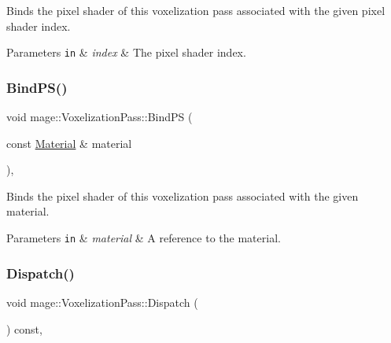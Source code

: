 Binds the pixel shader of this voxelization pass associated with the given pixel shader index.


\begin{DoxyParams}[1]{Parameters}
\mbox{\tt in}  & {\em index} & The pixel shader index. \\
\hline
\end{DoxyParams}
\hypertarget{classmage_1_1_voxelization_pass_a4dce943e59020690124a2db73004d135}{}\label{classmage_1_1_voxelization_pass_a4dce943e59020690124a2db73004d135} 
\subsubsection{\texorpdfstring{Bind\+P\+S()}{BindPS()}\hspace{0.1cm}{\footnotesize\ttfamily [2/2]}}
{\footnotesize\ttfamily void mage\+::\+Voxelization\+Pass\+::\+Bind\+PS (\begin{DoxyParamCaption}\item[{const \hyperlink{classmage_1_1_material}{Material} \&}]{material }\end{DoxyParamCaption})\hspace{0.3cm}{\ttfamily [private]}, {\ttfamily [noexcept]}}

Binds the pixel shader of this voxelization pass associated with the given material.


\begin{DoxyParams}[1]{Parameters}
\mbox{\tt in}  & {\em material} & A reference to the material. \\
\hline
\end{DoxyParams}
\hypertarget{classmage_1_1_voxelization_pass_ada3b9ac5f11073929db725c762bb48da}{}\label{classmage_1_1_voxelization_pass_ada3b9ac5f11073929db725c762bb48da} 
\subsubsection{\texorpdfstring{Dispatch()}{Dispatch()}}
{\footnotesize\ttfamily void mage\+::\+Voxelization\+Pass\+::\+Dispatch (\begin{DoxyParamCaption}{ }\end{DoxyParamCaption}) const\hspace{0.3cm}{\ttfamily [private]}, {\ttfamily [noexcept]}}

